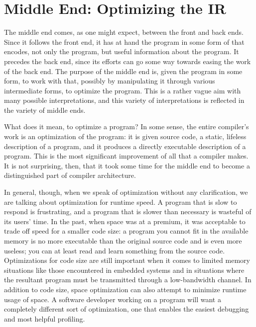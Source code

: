\section{Middle End: Optimizing the IR}\label{background:compilers:middle}
The middle end comes, as one might expect, between the front and back ends. Since it follows the front end, it has at hand the program in some form of \IR that encodes, not only the program, but useful information about the program. It precedes the back end, since its efforts can go some way towards easing the work of the back end. The purpose of the middle end is, given the program in some form, to work with that, possibly by manipulating it through various intermediate forms, to optimize the program. This is a rather vague aim with many possible interpretations, and this variety of interpretations is reflected in the variety of middle ends.

What does it mean, to optimize a program? In some sense, the entire compiler's work is an optimization of the program: it is given source code, a static, lifeless description of a program, and it produces a directly executable description of a program. This is the most significant improvement of all that a compiler makes. It is not surprising, then, that it took some time for the middle end to become a distinguished part of compiler architecture.

In general, though, when we speak of optimization without any clarification, we are talking about optimization for runtime speed. A program that is slow to respond is frustrating, and a program that is slower than necessary is wasteful of its users' time. In the past, when space was at a premium, it was acceptable to trade off speed for a smaller code size: a program you cannot fit in the available memory is no more executable than the original source code and is even more useless; you can at least read and learn something from the source code. Optimizations for code size are still important when it comes to limited memory situations like those encountered in embedded systems and in situations where the resultant program must be transmitted through a low-bandwidth channel. In addition to code size, space optimization can also attempt to minimize runtime usage of space. A software developer working on a program will want a completely different sort of optimization, one that enables the easiest debugging and most helpful profiling.

